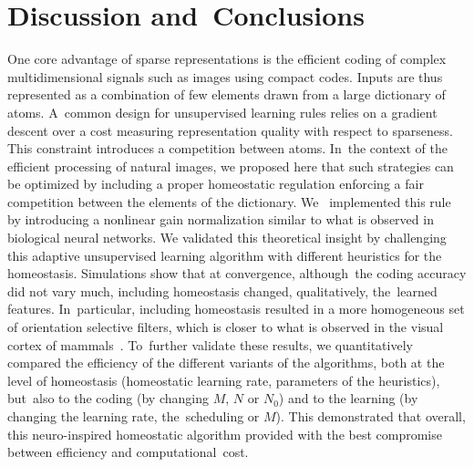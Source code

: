 \documentclass[vision,article,accept,oneauthor,pdftex]{Definitions/mdpi}
\newcommand{\seeFig}[1]{Figure~\ref{fig:#1}}%
\begin{document}
\section{Discussion and~Conclusions}\label{discussion-et-conclusion}

One core advantage of sparse representations is the efficient coding of complex multidimensional signals such as images using compact codes. Inputs are thus represented as a combination of few elements drawn from a large dictionary of atoms. A~common design for unsupervised learning rules relies on a gradient descent over a cost measuring representation quality with respect to sparseness. This constraint introduces a competition between atoms. In~the context of the efficient processing of natural images, we proposed here that such strategies can be optimized by including a proper homeostatic regulation enforcing a fair competition between the elements of the dictionary. We~ implemented this rule by introducing a nonlinear gain normalization similar to what is observed in biological neural networks. We validated this theoretical insight by challenging this adaptive unsupervised learning algorithm with different heuristics for the homeostasis. Simulations show that at convergence, although~the coding accuracy did not vary much, including homeostasis changed, qualitatively, the~learned features. In~particular, including homeostasis resulted in a more homogeneous set of orientation selective filters, which is closer to what is observed in the visual cortex of mammals~\citep{Ringach02,Rehn07,Loxley17}. To~further validate these results, we quantitatively compared the efficiency of the different variants of the algorithms, both at the level of homeostasis (homeostatic learning rate, parameters of the heuristics), but~also to the coding (by changing $M$, $N$ or $N_0$) and to the learning (by changing the learning rate, the~scheduling or $M$). This demonstrated that overall, this neuro-inspired homeostatic algorithm provided with the best compromise between efficiency and computational~cost.
\end{document}
